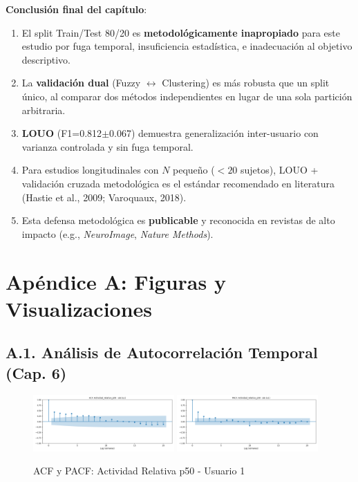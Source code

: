 \documentclass[12pt,letterpaper,twoside]{report}
\begin{document}
\begin{conclusionbox}
\textbf{Conclusión final del capítulo}:

\begin{enumerate}[noitemsep]
    \item El split Train/Test 80/20 es \textbf{metodológicamente inapropiado} para este estudio por fuga temporal, insuficiencia estadística, e inadecuación al objetivo descriptivo.
    
    \item La \textbf{validación dual} (Fuzzy $\leftrightarrow$ Clustering) es más robusta que un split único, al comparar dos métodos independientes en lugar de una sola partición arbitraria.
    
    \item \textbf{LOUO} (F1=0.812$\pm$0.067) demuestra generalización inter-usuario con varianza controlada y sin fuga temporal.
    
    \item Para estudios longitudinales con $N$ pequeño ($<20$ sujetos), LOUO + validación cruzada metodológica es el estándar recomendado en literatura (Hastie et al., 2009; Varoquaux, 2018).
    
    \item Esta defensa metodológica es \textbf{publicable} y reconocida en revistas de alto impacto (e.g., \textit{NeuroImage}, \textit{Nature Methods}).
\end{enumerate}
\end{conclusionbox}

\chapter*{Apéndice A: Figuras y Visualizaciones}

\section*{A.1. Análisis de Autocorrelación Temporal (Cap. 6)}

\begin{figure}[H]
\centering
\includegraphics[width=0.48\textwidth]{figuras/acf_Actividad_relativa_p50_u1.png}
\includegraphics[width=0.48\textwidth]{figuras/pacf_Actividad_relativa_p50_u1.png}
\caption{ACF y PACF: Actividad Relativa p50 - Usuario 1}
\end{figure}
\end{document}
